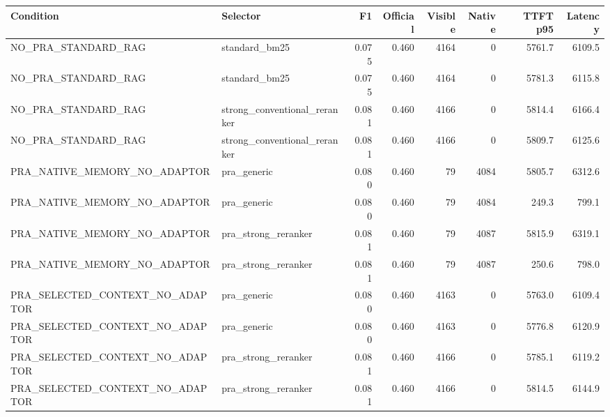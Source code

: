 \begin{tabular}{llrrrrrr}
\toprule
Condition & Selector & F1 & Official & Visible & Native & TTFT p95 & Latency \\
\midrule
NO\_PRA\_STANDARD\_RAG & standard\_bm25 & 0.075 & 0.460 & 4164 & 0 & 5761.7 & 6109.5 \\
NO\_PRA\_STANDARD\_RAG & standard\_bm25 & 0.075 & 0.460 & 4164 & 0 & 5781.3 & 6115.8 \\
NO\_PRA\_STANDARD\_RAG & strong\_conventional\_reranker & 0.081 & 0.460 & 4166 & 0 & 5814.4 & 6166.4 \\
NO\_PRA\_STANDARD\_RAG & strong\_conventional\_reranker & 0.081 & 0.460 & 4166 & 0 & 5809.7 & 6125.6 \\
PRA\_NATIVE\_MEMORY\_NO\_ADAPTOR & pra\_generic & 0.080 & 0.460 & 79 & 4084 & 5805.7 & 6312.6 \\
PRA\_NATIVE\_MEMORY\_NO\_ADAPTOR & pra\_generic & 0.080 & 0.460 & 79 & 4084 & 249.3 & 799.1 \\
PRA\_NATIVE\_MEMORY\_NO\_ADAPTOR & pra\_strong\_reranker & 0.081 & 0.460 & 79 & 4087 & 5815.9 & 6319.1 \\
PRA\_NATIVE\_MEMORY\_NO\_ADAPTOR & pra\_strong\_reranker & 0.081 & 0.460 & 79 & 4087 & 250.6 & 798.0 \\
PRA\_SELECTED\_CONTEXT\_NO\_ADAPTOR & pra\_generic & 0.080 & 0.460 & 4163 & 0 & 5763.0 & 6109.4 \\
PRA\_SELECTED\_CONTEXT\_NO\_ADAPTOR & pra\_generic & 0.080 & 0.460 & 4163 & 0 & 5776.8 & 6120.9 \\
PRA\_SELECTED\_CONTEXT\_NO\_ADAPTOR & pra\_strong\_reranker & 0.081 & 0.460 & 4166 & 0 & 5785.1 & 6119.2 \\
PRA\_SELECTED\_CONTEXT\_NO\_ADAPTOR & pra\_strong\_reranker & 0.081 & 0.460 & 4166 & 0 & 5814.5 & 6144.9 \\
\bottomrule
\end{tabular}
